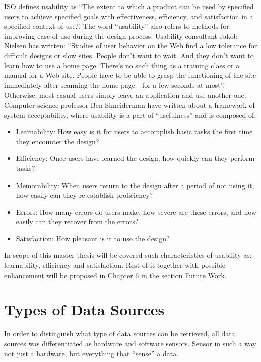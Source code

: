 	ISO defines usability as ``The extent to which a product can be used by specified users to achieve specified goals with effectiveness, efficiency, and satisfaction in a specified context of use.''. The word ``usability'' also refers to methods for improving ease-of-use during the design process. Usability consultant Jakob Nielsen has written: ``Studies of user behavior on the Web find a low tolerance for difficult designs or slow sites. People don't want to wait. And they don't want to learn how to use a home page. There's no such thing as a training class or a manual for a Web site. People have to be able to grasp the functioning of the site immediately after scanning the home page—for a few seconds at most''\cite{wiki:usability}. Otherwise, most casual users simply leave an application and use another one. Computer science professor Ben Shneiderman have written about a framework of system acceptability, where usability is a part of ``usefulness'' and is composed of\cite{jakob}:
	\begin{itemize}
	\item Learnability: How easy is it for users to accomplish basic tasks the first time they encounter the design?
	\item Efficiency: Once users have learned the design, how quickly can they perform tasks?
	\item Memorability: When users return to the design after a period of not using it, how easily can they re establish proficiency?
	\item Errors: How many errors do users make, how severe are these errors, and how easily can they recover from the errors?
	\item Satisfaction: How pleasant is it to use the design?
	\end{itemize}

	In scope of this master thesis will be covered such characteristics of usability as: learnability, efficiency and satisfaction. Rest of it together with possible enhancement will be proposed in Chapter 6 in the section Future Work.

\section {Types of Data Sources}
    In order to distinguish what type of data sources can be retrieved, all data sources was differentiated as hardware and software sensors. Sensor in such a way not just a hardware, but everything that ``sense'' a data.

